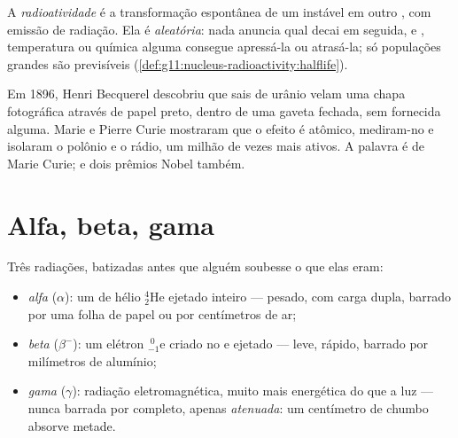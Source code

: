 \begin{definition}[Radioatividade]\label{def:g11:nucleus-radioactivity:radioactivity}
A \emph{radioatividade} é a transformação espontânea
de um  instável em outro , com emissão de radiação. Ela é
\emph{aleatória}: nada anuncia qual  decai em seguida, e ,
temperatura ou química alguma consegue apressá-la ou atrasá-la; só
populações grandes são previsíveis
(\cref{def:g11:nucleus-radioactivity:halflife}).
\end{definition}

\begin{remark}\label{rem:g11:nucleus-radioactivity:curie}
Em 1896, Henri Becquerel descobriu que sais de urânio velam uma chapa
fotográfica através de papel preto, dentro de uma gaveta fechada, sem
 fornecida alguma. Marie e Pierre Curie mostraram que o efeito é
atômico, mediram-no e isolaram o polônio e o rádio, um milhão de vezes
mais ativos. A palavra \emph{} é de Marie Curie; e dois
prêmios Nobel também.
\end{remark}

\section{Alfa, beta, gama}

\begin{definition}\label{def:g11:nucleus-radioactivity:abg}
Três radiações, batizadas antes que alguém soubesse o que elas eram:
\begin{itemize}
  \item \emph{alfa} ($\alpha$): um  de hélio
        ${}^{4}_{2}\mathrm{He}$ ejetado inteiro --- pesado, com carga
        dupla, barrado por uma folha de papel ou por centímetros de ar;
  \item \emph{beta} ($\beta^-$): um elétron
        ${}^{\;0}_{-1}\mathrm{e}$ criado no  e ejetado --- leve,
        rápido, barrado por milímetros de alumínio;
  \item \emph{gama} ($\gamma$): radiação
        eletromagnética, muito mais energética do que a luz --- nunca
        barrada por completo, apenas
        \emph{atenuada}: um centímetro de chumbo absorve
        metade.
\end{itemize}
\end{definition}

